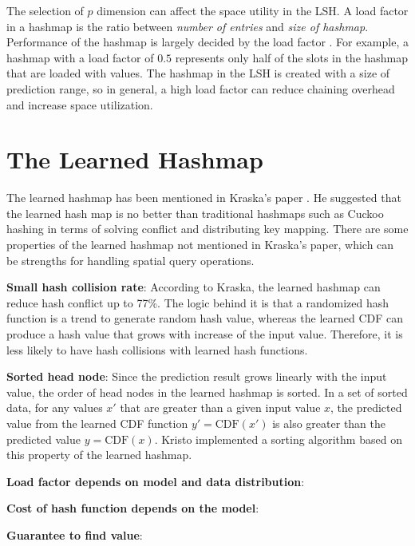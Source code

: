  The selection of $p$ dimension can affect the space utility in the LSH. A load factor in a hashmap is the ratio between \textit{number of entries} and \textit{size of hashmap}. Performance of the hashmap is largely decided by the load factor \cite{hashmap}. For example, a hashmap with a load factor of $0.5$ represents only half of the slots in the hashmap that are loaded with values. The hashmap in the LSH is created with a size of prediction range, so in general, a high load factor can reduce chaining overhead and increase space utilization. 


\section{The Learned Hashmap} \label{the_learned_hashmap}

The learned hashmap has been mentioned in Kraska’s paper \cite{Kafle:2017dy}. He suggested that the learned hash map is no better than traditional hashmaps such as Cuckoo hashing in terms of solving conflict and distributing key mapping. There are some properties of the learned hashmap not mentioned in Kraska's paper, which can be strengths for handling spatial query operations. 


\textbf{Small hash collision rate}: According to Kraska, the learned hashmap can reduce hash conflict up to 77\%. The logic behind it is that a randomized hash function is a trend to generate random hash value, whereas the learned CDF can produce a hash value that grows with increase of the input value. Therefore, it is less likely to have hash collisions with learned hash functions.

\textbf{Sorted head node}: Since the prediction result grows linearly with the input value, the order of head nodes in the learned hashmap is sorted. In a set of sorted data, for any values $x\prime$ that are greater than a given input value $x$, the predicted value from the learned CDF function $y\prime = \text{CDF}(x\prime)$ is also greater than the predicted value $y = \text{CDF}(x)$. Kristo \cite{Kristo:2020it} implemented a sorting algorithm based on this property of the learned hashmap. 

\textbf{Load factor depends on model and data distribution}: 

\textbf{Cost of hash function depends on the model}: 


\textbf{Guarantee to find value}: 


